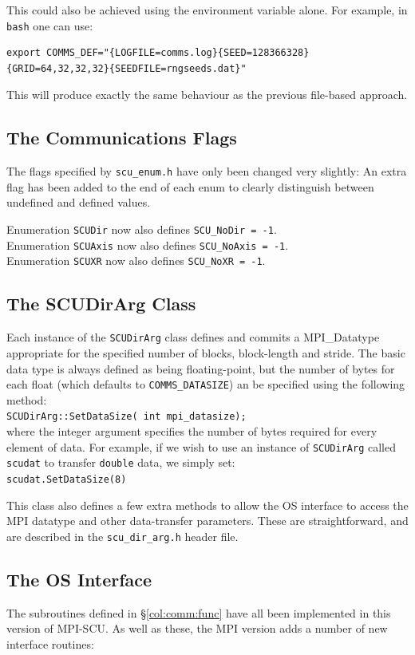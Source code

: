 \documentclass[12pt]{article}
\newcommand{\cde}[1]{{\tt #1}}            %
\begin{document}
This could also be achieved using the environment variable alone.  For
example, in \cde{bash} one can use:
\begin{verbatim}  
export COMMS_DEF="{LOGFILE=comms.log}{SEED=128366328}
{GRID=64,32,32,32}{SEEDFILE=rngseeds.dat}"
\end{verbatim}
This will produce exactly the same behaviour as the previous
file-based approach.

\subsection{The Communications Flags}
The flags specified by \cde{scu\_enum.h} have only been changed very
slightly:  An extra flag has been added to the end of each enum to
clearly distinguish between undefined and defined values.

Enumeration \cde{SCUDir} now also defines \cde{SCU\_NoDir = -1}.\\
Enumeration \cde{SCUAxis} now also defines \cde{SCU\_NoAxis = -1}.\\
Enumeration \cde{SCUXR} now also defines \cde{SCU\_NoXR = -1}.

\subsection{The SCUDirArg Class}
Each instance of the \cde{SCUDirArg} class defines and commits a
MPI\_Datatype appropriate for the specified number of blocks,
block-length and stride.  The basic data type is always defined as
being floating-point, but the number of bytes for each float (which
defaults to \cde{COMMS\_DATASIZE}) an be specified using the following
method:\\
\cde{SCUDirArg::SetDataSize( int mpi\_datasize);}\\
where the integer argument specifies the number of bytes required for
every element of data.  For example, if we wish to use an instance of
\cde{SCUDirArg} called \cde{scudat} to transfer \cde{double} data, we
simply set:\\
\cde{scudat.SetDataSize(8)}

This class also defines a few extra methods to allow the OS interface
to access the MPI datatype and other data-transfer parameters.  These
are straightforward, and are described in the \cde{scu\_dir\_arg.h}
header file.

\subsection{The OS Interface}
The subroutines defined in \S\ref{col:comm:func} have all been
implemented in this version of MPI-SCU.  As well as these, the MPI
version adds a number of new interface routines:
\end{document}

